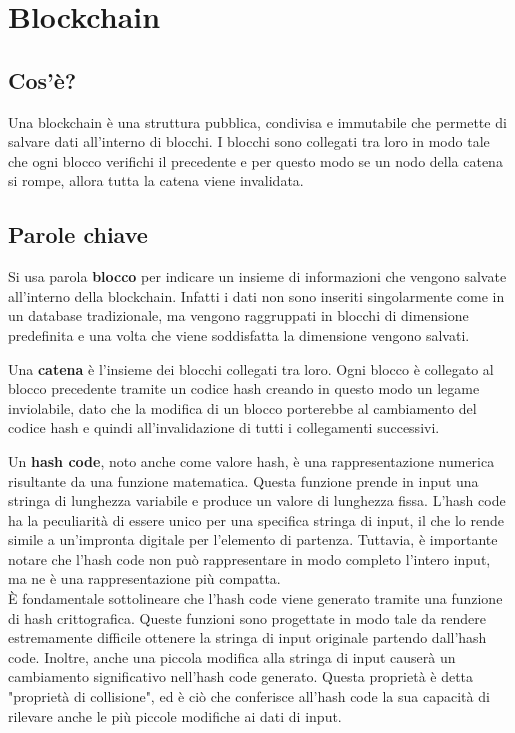 \chapter{Blockchain}
\label{cha:blockchain}

\section{Cos'è?}
Una blockchain è una struttura pubblica, condivisa e immutabile che permette di
salvare dati all'interno di blocchi. I blocchi sono collegati tra loro in modo
tale che ogni blocco verifichi il precedente e per questo modo se un nodo della
catena si rompe, allora tutta la catena viene invalidata.

\section{Parole chiave}
Si usa parola \textbf{blocco} per indicare un insieme di informazioni che
vengono salvate all'interno della blockchain. Infatti i dati non sono inseriti
singolarmente come in un database tradizionale, ma vengono raggruppati in
blocchi di dimensione predefinita e una volta che viene soddisfatta la
dimensione vengono salvati.

Una \textbf{catena} è l'insieme dei blocchi collegati tra loro. Ogni blocco è 
collegato al blocco precedente tramite un codice hash creando in questo modo
un legame inviolabile, dato che la modifica di un blocco porterebbe al 
cambiamento del codice hash e quindi all'invalidazione di tutti i collegamenti
successivi.

%
Un \textbf{hash code}, noto anche come valore hash, è una rappresentazione
numerica risultante da una funzione matematica. Questa funzione prende in input
una stringa di lunghezza variabile e produce un valore di lunghezza fissa.
L'hash code ha la peculiarità di essere unico per una specifica stringa di
input, il che lo rende simile a un'impronta digitale per l'elemento di
partenza. Tuttavia, è importante notare che l'hash code non può rappresentare
in modo completo l'intero input, ma ne è una rappresentazione più compatta. \\
È fondamentale sottolineare che l'hash code viene generato tramite una funzione
di hash crittografica. Queste funzioni sono progettate in modo tale da rendere
estremamente difficile ottenere la stringa di input originale partendo
dall'hash code. Inoltre, anche una piccola modifica alla stringa di input
causerà un cambiamento significativo nell'hash code generato. Questa proprietà
è detta "proprietà di collisione", ed è ciò che conferisce all'hash code la sua
capacità di rilevare anche le più piccole modifiche ai dati di input.

